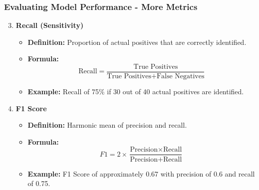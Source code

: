 \documentclass[aspectratio=169]{beamer}
\begin{document}
\begin{frame}[fragile]
    \frametitle{Evaluating Model Performance - More Metrics}
    \begin{enumerate}
        \setcounter{enumi}{2}
        \item \textbf{Recall (Sensitivity)}
        \begin{itemize}
            \item \textbf{Definition:} Proportion of actual positives that are correctly identified.
            \item \textbf{Formula:}
            \[
            \text{Recall} = \frac{\text{True Positives}}{\text{True Positives} + \text{False Negatives}}
            \]
            \item \textbf{Example:} Recall of 75\% if 30 out of 40 actual positives are identified.
        \end{itemize}

        \item \textbf{F1 Score}
        \begin{itemize}
            \item \textbf{Definition:} Harmonic mean of precision and recall.
            \item \textbf{Formula:}
            \[
            F1 = 2 \times \frac{\text{Precision} \times \text{Recall}}{\text{Precision} + \text{Recall}}
            \]
            \item \textbf{Example:} F1 Score of approximately 0.67 with precision of 0.6 and recall of 0.75.
        \end{itemize}
    \end{enumerate}
\end{frame}
\end{document}
